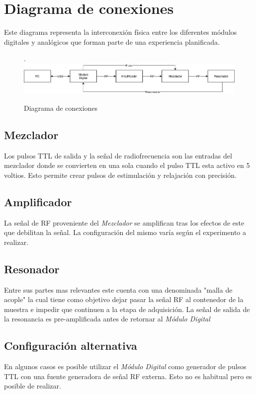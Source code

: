 \section{Diagrama de conexiones}

Este diagrama representa la interconexi\'on f\'isica entre los diferentes m\'odulos digitales y anal\'ogicos que forman
parte de una experiencia planificada.

\begin{figure}[!htb].
    \includegraphics[width=\linewidth]{../figures/d4.jpg}
    \caption{Diagrama de conexiones}
    \label{fig:d4}
\end{figure}
  

\subsection{Mezclador}

Los pulsos TTL de salida y la se\~nal de radiofrecuencia son las entradas del mezclador
donde se convierten en una sola cuando el pulso TTL esta activo en 5 voltios.
Esto permite crear pulsos de estimulaci\'on y relajaci\'on con precisi\'on.

\subsection{Amplificador}
La se\~nal de RF proveniente del \textit{Mezclador} se amplifican tras los efectos de este que debilitan la se\~nal.
La configuraci\'on del mismo var\'ia seg\'un el experimento a realizar.

\subsection{Resonador}
Entre sus partes mas relevantes este cuenta con una denominada "malla de acople" la cual
tiene como objetivo dejar pasar la se\~nal RF al contenedor de la muestra e impedir
que continuen a la etapa de adquisici\'on.
La se\~nal de salida de la resonancia es pre-amplificada antes de retornar al \textit{M\'odulo Digital}

\subsection{Configuraci\'on alternativa}
En algunos casos es posible utilizar el \textit{M\'odulo Digital} como generador de pulsos TTL con una fuente
generadora de se\~nal RF externa. Esto no es habitual pero es posible de realizar.

\newpage
